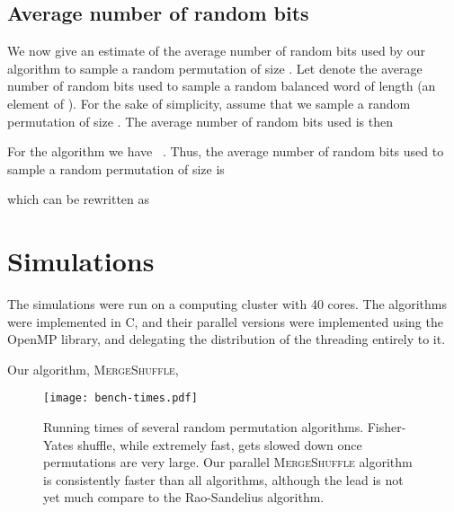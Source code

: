 \documentclass[letter,11pt,en]{quick-document}
\begin{document}
\subsection{Average number of random bits}

We now give an estimate of the average number of random bits used by our
algorithm to sample a random permutation of size . Let 
denote the average number of random bits used to sample a random balanced
word of length  (an element of ). For the sake of simplicity,
assume that we sample a random permutation of size . The average
number of random bits used is then


For the algorithm we have
~\cite{BaBoJa14}. Thus, the average
number of random bits used to sample a random permutation of size
 is

which can be rewritten as



\section{Simulations}

The simulations were run on a computing cluster with 40 cores. The
algorithms were implemented in C, and their parallel versions were
implemented using the OpenMP library, and delegating the distribution of
the threading entirely to it. 

Our algorithm, \textsc{MergeShuffle}, 

\begin{figure}[H]
\begin{center}
\texttt{[image: bench-times.pdf]}
\end{center}
\caption{Running times of several random permutation algorithms.
  Fisher-Yates shuffle, while extremely fast, gets slowed down once
  permutations are very large. Our parallel \textsc{MergeShuffle}
  algorithm is consistently faster than all algorithms, although the lead
  is not yet much compare to the Rao-Sandelius algorithm.}
\end{figure}
\end{document}
